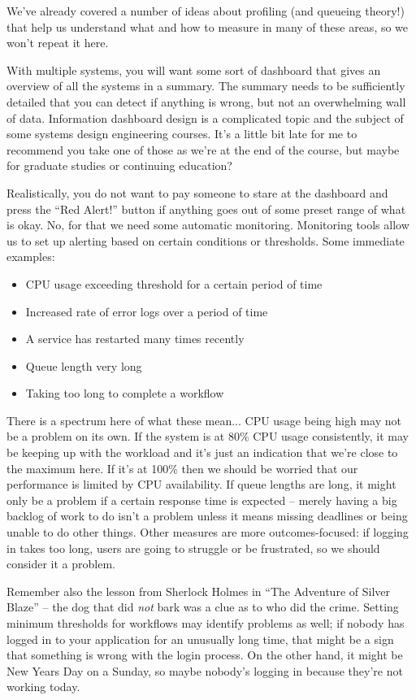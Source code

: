 \documentclass[a4paper]{report}
\begin{document}
We've already covered a number of ideas about profiling (and queueing theory!) that help us understand what and how to measure in many of these areas, so we won't repeat it here.

With multiple systems, you will want some sort of dashboard that gives an overview of all the systems in a summary. The summary needs to be sufficiently detailed that you can detect if anything is wrong, but not an overwhelming wall of data. Information dashboard design is a complicated topic and the subject of some systems design engineering courses. It's a little bit late for me to recommend you take one of those as we're at the end of the course, but maybe for graduate studies or continuing education?

Realistically, you do not want to pay someone to stare at the dashboard and press the  ``Red Alert!'' button if anything goes out of some preset range of what is okay. No, for that we need some automatic monitoring. Monitoring tools allow us to set up alerting based on certain conditions or thresholds. Some immediate examples:
\begin{itemize}
	\item CPU usage exceeding threshold for a certain period of time
	\item Increased rate of error logs over a period of time
	\item A service has restarted many times recently
	\item Queue length very long
	\item Taking too long to complete a workflow
\end{itemize}



There is a spectrum here of what these mean... CPU usage being high may not be a problem on its own. If the system is at 80\% CPU usage consistently, it may be keeping up with the workload and it's just an indication that we're close to the maximum here. If it's at 100\% then we should be worried that our performance is limited by CPU availability. If queue lengths are long, it might only be a problem if a certain response time is expected -- merely having a big backlog of work to do isn't a problem unless it means missing deadlines or being unable to do other things. Other measures are more outcomes-focused: if logging in takes too long, users are going to struggle or be frustrated, so we should consider it a problem.

Remember also the lesson from Sherlock Holmes in ``The Adventure of Silver Blaze'' -- the dog that did \textit{not} bark was a clue as to who did the crime. Setting minimum thresholds for workflows may identify problems as well; if nobody has logged in to your application for an unusually long time, that might be a sign that something is wrong with the login process. On the other hand, it might be New Years Day on a Sunday, so maybe nobody's logging in because they're not working today.
\end{document}
